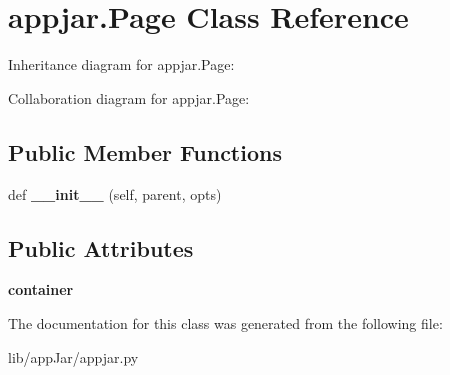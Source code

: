 \hypertarget{classappjar_1_1_page}{}\section{appjar.\+Page Class Reference}
\label{classappjar_1_1_page}


Inheritance diagram for appjar.\+Page\+:


Collaboration diagram for appjar.\+Page\+:
\subsection*{Public Member Functions}
\begin{DoxyCompactItemize}
\item 
\mbox{\label{classappjar_1_1_page_a49e4b9a541cedffb9a11c4a25bb8c12a}} 
def {\bfseries \+\_\+\+\_\+init\+\_\+\+\_\+} (self, parent, opts)
\end{DoxyCompactItemize}
\subsection*{Public Attributes}
\begin{DoxyCompactItemize}
\item 
\mbox{\label{classappjar_1_1_page_a8d375f3fd29c279c3d0ead158c4b1e0d}} 
{\bfseries container}
\end{DoxyCompactItemize}


The documentation for this class was generated from the following file\+:\begin{DoxyCompactItemize}
\item 
lib/app\+Jar/appjar.\+py\end{DoxyCompactItemize}
